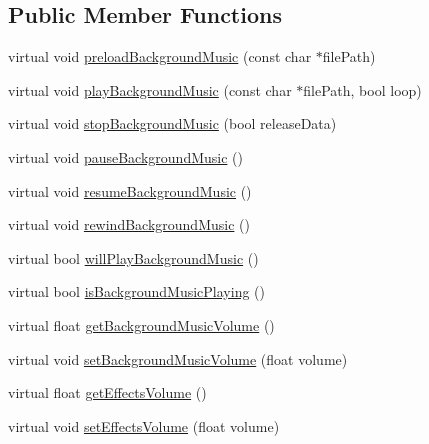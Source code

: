 \subsection*{Public Member Functions}
\begin{DoxyCompactItemize}
\item 
virtual void \hyperlink{classCocosDenshion_1_1android_1_1AndroidJavaEngine_af7e9de02572a200bdc590e1efa731688}{preload\+Background\+Music} (const char $\ast$file\+Path)
\item 
virtual void \hyperlink{classCocosDenshion_1_1android_1_1AndroidJavaEngine_a510170bb28df6e2035ad479831e6ef33}{play\+Background\+Music} (const char $\ast$file\+Path, bool loop)
\item 
virtual void \hyperlink{classCocosDenshion_1_1android_1_1AndroidJavaEngine_a736969e835ddb130f9f25976af4ed94f}{stop\+Background\+Music} (bool release\+Data)
\item 
virtual void \hyperlink{classCocosDenshion_1_1android_1_1AndroidJavaEngine_a414fc89d87fca8d1a354e893a1117295}{pause\+Background\+Music} ()
\item 
virtual void \hyperlink{classCocosDenshion_1_1android_1_1AndroidJavaEngine_aad61da9bf83bd3f16fbef06cbbb04b38}{resume\+Background\+Music} ()
\item 
virtual void \hyperlink{classCocosDenshion_1_1android_1_1AndroidJavaEngine_a7c1e7ad61fe524b331c21c924141a34e}{rewind\+Background\+Music} ()
\item 
virtual bool \hyperlink{classCocosDenshion_1_1android_1_1AndroidJavaEngine_aa6301c0260249ef37088872b3710adeb}{will\+Play\+Background\+Music} ()
\item 
virtual bool \hyperlink{classCocosDenshion_1_1android_1_1AndroidJavaEngine_a2bfbe26dae6b6a8a18fcd3e6e97f0c7e}{is\+Background\+Music\+Playing} ()
\item 
virtual float \hyperlink{classCocosDenshion_1_1android_1_1AndroidJavaEngine_ab9c6ae5e936cb51283f804e163947e2c}{get\+Background\+Music\+Volume} ()
\item 
virtual void \hyperlink{classCocosDenshion_1_1android_1_1AndroidJavaEngine_a98d2ffd728746eacce6f4471c1bd68a7}{set\+Background\+Music\+Volume} (float volume)
\item 
virtual float \hyperlink{classCocosDenshion_1_1android_1_1AndroidJavaEngine_a21e1cc7de8f050587bbcf35e46add189}{get\+Effects\+Volume} ()
\item 
virtual void \hyperlink{classCocosDenshion_1_1android_1_1AndroidJavaEngine_a409927c7297304f191bf3b96c289fb7a}{set\+Effects\+Volume} (float volume)

\end{DoxyCompactItemize}
